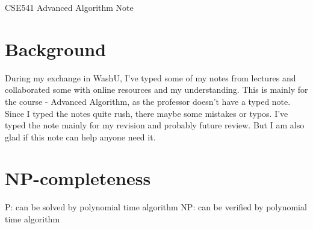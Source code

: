 \documentclass[12pt]{article}
\begin{document}

\begin{center}
    \Large CSE541 Advanced Algorithm Note
\end{center}

\section{Background}

During my exchange in WashU, I've typed some of my notes from lectures and collaborated some with online resources and my understanding. This is mainly for the course - Advanced Algorithm, as the professor doesn't have a typed note. Since I typed the notes quite rush, there maybe some mistakes or typos. I've typed the note mainly for my revision and probably future review. But I am also glad if this note can help anyone need it.

\section{NP-completeness} 

P: can be solved by polynomial time algorithm
NP: can be verified by polynomial time algorithm
\end{document}
